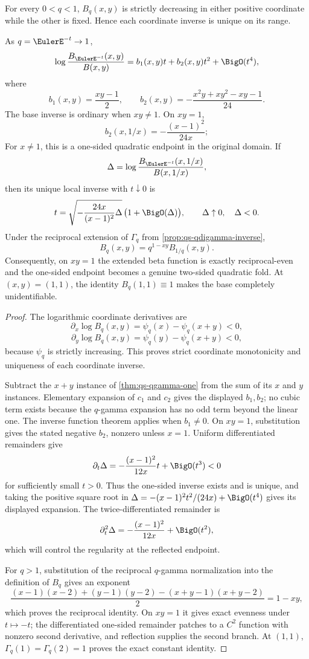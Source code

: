 \begin{theorem}
\label{thm:qs-qbeta}
For every \(0<q<1\), \(B_q(x,y)\) is strictly decreasing in either positive
coordinate while the other is fixed.  Hence each coordinate inverse is
unique on its range.

As \(q=\EulerE^{-t}\to1\),
\[
  \log\frac{B_{\EulerE^{-t}}(x,y)}{B(x,y)}
  =b_1(x,y)t+b_2(x,y)t^2+\BigO(t^4),
\]
where
\[
  b_1(x,y)=\frac{xy-1}{2},
  \qquad
  b_2(x,y)=-\frac{x^2y+xy^2-xy-1}{24}.
\]
The base inverse is ordinary when \(xy\ne1\).  On \(xy=1\),
\[
  b_2(x,1/x)=-\frac{(x-1)^2}{24x};
\]
For \(x\ne1\), this is a one-sided quadratic endpoint in the original
domain.  If
\[
 \Delta=\log\frac{B_{\EulerE^{-t}}(x,1/x)}{B(x,1/x)},
\]
then its unique local inverse with \(t\downarrow0\) is
\[
 t=\sqrt{-\frac{24x}{(x-1)^2}\Delta}\,
 \bigl(1+\BigO(\Delta)\bigr),
 \qquad \Delta\uparrow0,\quad \Delta<0.
\]
Under the reciprocal extension of \(\Gamma_q\) from
\cref{prop:qs-qdigamma-inverse},
\[
 B_q(x,y)=q^{1-xy}B_{1/q}(x,y).
\]
Consequently, on \(xy=1\) the extended beta function is exactly
reciprocal-even and the one-sided endpoint becomes a genuine two-sided
quadratic fold.  At \((x,y)=(1,1)\), the identity \(B_q(1,1)\equiv1\)
makes the base completely unidentifiable.
\end{theorem}

\begin{proof}
The logarithmic coordinate derivatives are
\[
  \partial_x\log B_q(x,y)=\psi_q(x)-\psi_q(x+y)<0,
\]
\[
  \partial_y\log B_q(x,y)=\psi_q(y)-\psi_q(x+y)<0,
\]
because \(\psi_q\) is strictly increasing.  This proves strict coordinate
monotonicity and uniqueness of each coordinate inverse.

Subtract the \(x+y\) instance of \cref{thm:qs-qgamma-one} from the sum of its
\(x\) and \(y\) instances.  Elementary expansion of \(c_1\) and \(c_2\)
gives the displayed \(b_1,b_2\); no cubic term exists because the
\(q\)-gamma expansion has no odd term beyond the linear one.  The inverse
function theorem applies when \(b_1\ne0\).  On \(xy=1\), substitution gives
the stated negative \(b_2\), nonzero unless \(x=1\).  Uniform differentiated
remainders give
\[
 \partial_t\Delta
 =-\frac{(x-1)^2}{12x}t+\BigO(t^3)<0
\]
for sufficiently small \(t>0\).  Thus the one-sided inverse exists and is
unique, and taking the positive square root in
\(\Delta=-(x-1)^2t^2/(24x)+\BigO(t^4)\) gives its displayed expansion.
The twice-differentiated remainder is
\[
 \partial_t^2\Delta
 =-\frac{(x-1)^2}{12x}+\BigO(t^2),
\]
which will control the regularity at the reflected endpoint.

For \(q>1\), substitution of the reciprocal \(q\)-gamma normalization into
the definition of \(B_q\) gives an exponent
\[
 \frac{(x-1)(x-2)+(y-1)(y-2)-(x+y-1)(x+y-2)}2
 =1-xy,
\]
which proves the reciprocal identity.  On \(xy=1\) it gives exact evenness
under \(t\mapsto-t\); the differentiated one-sided remainder patches to a
\(C^2\) function with nonzero second derivative, and reflection supplies
the second branch.  At \((1,1)\),
\(\Gamma_q(1)=\Gamma_q(2)=1\) proves the exact constant identity.
\end{proof}

